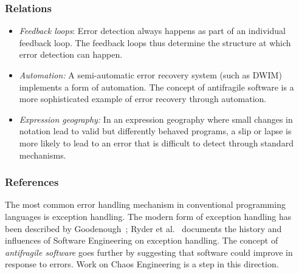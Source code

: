 \documentclass[english,submission]{programming}
\providecommand{\DIFaddbegin}{} %
\providecommand{\DIFaddend}{} %
\providecommand{\DIFdelbegin}{} %
\providecommand{\DIFdelend}{} %
\begin{document}
\DIFdelbegin %
\DIFdelend \DIFaddbegin \hypertarget{relations-3}{%
\subsubsection{Relations}\label{relations-3}}
\DIFaddend 

\begin{itemize}
\tightlist
\item
  \emph{Feedback loops}: Error detection always happens as part of an
  individual feedback loop. The feedback loops thus determine the
  structure at which error detection can happen.
\item
  \emph{Automation:} A semi-automatic error recovery system (such as
  DWIM) implements a form of automation. The concept of antifragile
  software \cite{Antifragile} is a more sophisticated example of error
  recovery through automation.
\item
  \emph{Expression geography:} In an expression geography where small
  changes in notation lead to valid but differently behaved programs, a
  slip or lapse is more likely to lead to an error that is difficult to
  detect through standard mechanisms.
\end{itemize}

\hypertarget{references-2}{%
\subsubsection{References}\label{references-2}}

The most common error handling mechanism in conventional programming
languages is exception handling. The modern form of exception handling
has been described by Goodenough~\cite{ExceptionHandling}; Ryder et
al.~\cite{SweImpact} documents the history and influences of Software
Engineering on exception handling. The concept of \emph{antifragile
software} \cite{Antifragile} goes further by suggesting that software
could improve in response to errors. Work on Chaos Engineering
\cite{ChaosMonkey} is a step in this direction.
\end{document}
